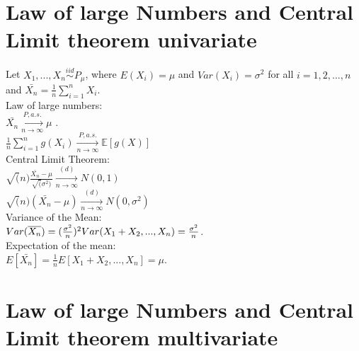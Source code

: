 \section{Law of large Numbers and Central Limit theorem univariate}
Let $X_1, ..., X_n \stackrel{iid}{\sim} P_{\mu}$, where $E(X_i)=\mu$ and $Var(X_i)=\sigma^2$ for all $i=1,2,...,n$ and $\bar{X_n}= \frac{1}{n} \sum_{i=1}^{n} X_i$.\\

Law of large numbers:\\

$\bar{X_n} \xrightarrow[n \rightarrow \infty]{P, a.s.} \mu$ .\\

$ \frac{1}{n} \sum_{i=1}^{n} g(X_i) \xrightarrow[n \rightarrow \infty]{P, a.s.} \mathbb{E}[g(X)]$\\

Central Limit Theorem:\\

$\sqrt(n)\frac{\bar{X_n}-\mu}{\sqrt(\sigma^2)} \xrightarrow[n \rightarrow \infty]{(d)} N(0,1)$\\

$\sqrt(n)(\bar{X_n}-\mu) \xrightarrow[n \rightarrow \infty]{(d)} N(0,\sigma^2)$\\

Variance of the Mean:\\

$Var(\overline{X_n})=\\
(\frac{\sigma^2}{n})^2 Var(X_1 + X_2,...,X_n) =  \frac{\sigma^2}{n}$.\\

Expectation of the mean:\\

$E[\bar{X_n}]=\frac{1}{n}E[X_1 + X_2,...,X_n] = \mu$.

\section{Law of large Numbers and Central Limit theorem multivariate}
